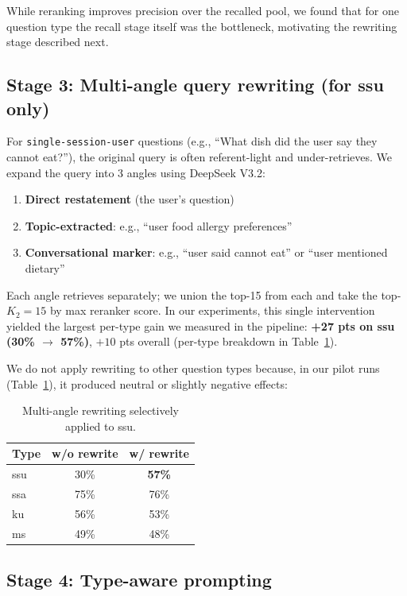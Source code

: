 While reranking improves precision over the recalled pool, we found that
for one question type the recall stage itself was the bottleneck,
motivating the rewriting stage described next.

\subsection{Stage 3: Multi-angle query rewriting (for ssu only)}

For \texttt{single-session-user} questions (e.g., ``What dish did the user
say they cannot eat?''), the original query is often referent-light and
under-retrieves. We expand the query into 3 angles using DeepSeek V3.2:

\begin{enumerate}
\item \textbf{Direct restatement} (the user's question)
\item \textbf{Topic-extracted}: e.g., ``user food allergy preferences''
\item \textbf{Conversational marker}: e.g., ``user said cannot eat'' or ``user mentioned dietary''
\end{enumerate}

Each angle retrieves separately; we union the top-15 from each and take the
top-\(K_2=15\) by max reranker score. In our experiments, this single
intervention yielded the largest per-type gain we measured in the pipeline:
\textbf{+27 pts on ssu (30\% \(\to\) 57\%)}, \(+10\) pts overall (per-type
breakdown in Table~\ref{tab:rewrite}).

We do not apply rewriting to other question types because, in our pilot
runs (Table~\ref{tab:rewrite}), it produced neutral or slightly negative
effects:

\begin{table}[h]
\centering
\begin{tabular}{lcc}
\toprule
Type & w/o rewrite & w/ rewrite \\
\midrule
ssu & 30\% & \textbf{57\%} \\
ssa & 75\% & 76\% \\
ku & 56\% & 53\% \\
ms & 49\% & 48\% \\
\bottomrule
\end{tabular}
\caption{Multi-angle rewriting selectively applied to ssu.}
\label{tab:rewrite}
\end{table}

\subsection{Stage 4: Type-aware prompting}

